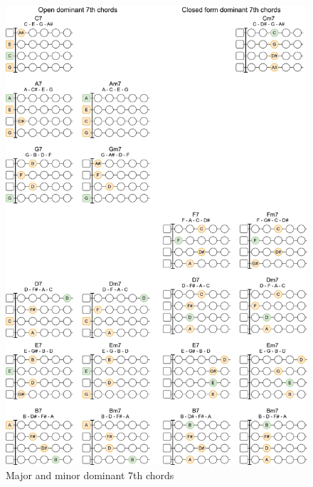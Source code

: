 \newpage

\begin{figure}[h]
	\centering
	\includegraphics[height=\textheight]{../../Images/UkuleleDominantSeventhChords.png}
	\caption{Major and minor dominant 7th chords}
	\label{fig:ukulele_major_minor_dominant_seventh_chords}
\end{figure}

\newpage